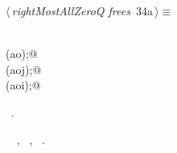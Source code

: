 \documentclass{article}
\begin{document}
\begin{flushleft} \small
\begin{minipage}{\linewidth}\label{scrap40}\raggedright\small
{} $\langle\,${\itshape rightMostAllZeroQ frees}\nobreak\ {\footnotesize {34a}}$\,\rangle\equiv$
\vspace{-1ex}
\begin{list}{}{} \item
\mbox{}\verb@@\\
\mbox{}\verb@free(ao);@\\
\mbox{}\verb@free(aoj);@\\
\mbox{}\verb@free(aoi);@\\
\mbox{}\verb@@{\NWsep}
\end{list}
\vspace{-1.5ex}
\footnotesize
\begin{list}{}{\setlength{\itemsep}{-\parsep}\setlength{\itemindent}{-\leftmargin}}
\item \NWtxtMacroRefIn\ .
\item \NWtxtIdentsUsed\nobreak\  \verb@ao@\nobreak\ , \verb@aoi@\nobreak\ , \verb@aoj@\nobreak\ .
\item{}
\end{list}
\end{minipage}\vspace{4ex}
\end{flushleft}
\end{document}
